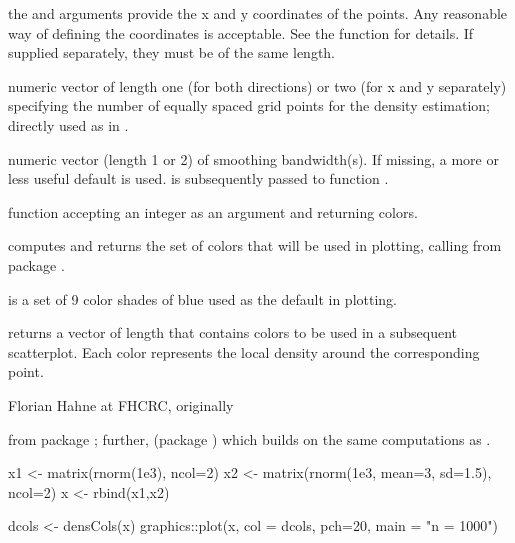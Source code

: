 \begin{Arguments}
\begin{ldescription}
\item[\code{x, y}] the  and  arguments provide the x and y
coordinates of the points.  Any reasonable way of defining the
coordinates is acceptable.  See the function 
for details.  If supplied separately, they must be of the same length.
\item[\code{nbin}] numeric vector of length one (for both directions) or two
(for x and y separately) specifying the number of equally spaced
grid points for the density estimation; directly used as
 in .
\item[\code{bandwidth}] numeric vector (length 1 or 2) of smoothing bandwidth(s).
If missing, a more or less useful default is used. 
is subsequently passed to function .
\item[\code{colramp}] function accepting an integer  as an argument and
returning  colors.
\end{ldescription}
\end{Arguments}
%
\begin{Details}\relax
{} computes and returns the set of colors that will be
used in plotting, calling  from package .

 is a set of 9 color shades of blue used as the default in
plotting.
\end{Details}
%
\begin{Value}
 returns a vector of length  that
contains colors to be used in a subsequent scatterplot.  Each color
represents the local density around the corresponding point.
\end{Value}
%
\begin{Author}\relax
Florian Hahne at FHCRC, originally
\end{Author}
%
\begin{SeeAlso}\relax
{} from package ;
further,  (package ) which
builds on the same computations as .
\end{SeeAlso}
%
\begin{Examples}
\begin{ExampleCode}
x1  <- matrix(rnorm(1e3), ncol=2)
x2  <- matrix(rnorm(1e3, mean=3, sd=1.5), ncol=2)
x   <- rbind(x1,x2)

dcols <- densCols(x)
graphics::plot(x, col = dcols, pch=20, main = "n = 1000")
\end{ExampleCode}
\end{Examples}
